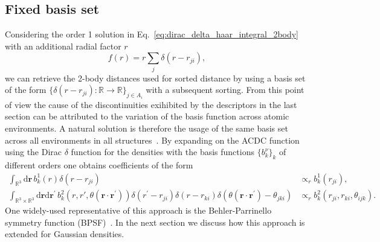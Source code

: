 \subsection{Fixed basis set}
Considering the order 1 solution in Eq.~\eqref{eq:dirac_delta_haar_integral_2body} with an additional radial factor $r$
\begin{equation}
  f(r) = r \sum_j \delta(r-r_{ji}),  %
\end{equation}
we can retrieve the 2-body distances used for sorted distance by using a basis set of the form $\{\delta(r-r_{ji}):\mathbb{R}\rightarrow\mathbb{R}\}_{j\in A_i}$ with a subsequent sorting.
From this point of view the cause of the discontinuities exihibited by the descriptors in the last section can be attributed to the variation of the basis function across atomic environments.
A natural solution is therefore the usage of the same basis set across all environments in all structures~\cite{behl11jcp,bart+13prb,drautz2019atomic}.
By expanding on the ACDC function using the Dirac $\delta$ function for the densities with the basis functions $\{b^\nu_k\}_k$ of different orders one obtains coefficients of the form
\begin{subequations}
\label{eq:dirac_delta_expansion_coeffs}
\begin{align}
    \label{eq:dirac_delta_expansion_coeffs_2body}
    \int_{\mathbb{R}^3}\mathrm{d}\mathbf{r}\, b^1_k(r)\delta(r-r_{ji}) &\propto_r b^1_k(r_{ji}),\\
    \label{eq:dirac_delta_expansion_coeffs_3body}
    \int_{\mathbb{R}^3\times\mathbb{R}^3}\mathrm{d}\mathbf{r}\mathrm{d}\mathbf{r}^\prime\, b^2_k(r,r\prime,\theta(\mathbf{r}\cdot\mathbf{r}^\prime))\delta(r^\prime-r_{ji})\delta(r-r_{ki})
    \delta(\theta(\mathbf{r}\cdot\mathbf{r}^\prime) - \theta_{jki}) &\propto_r b^2_k(r_{ji},r_{ki},\theta_{ijk}).
\end{align}
\end{subequations}
One widely-used representative of this approach is the Behler-Parrinello symmetry function (BPSF)~\cite{behl11jcp}.
In the next section we discuss how this approach is extended for Gaussian densities. 

